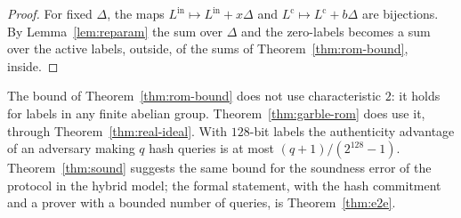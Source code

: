 \begin{proof}
  \leanok
  For fixed $\Delta$, the maps $L^{\mathrm{in}} \mapsto L^{\mathrm{in}} + x\Delta$ and
  $L^{\mathrm{c}} \mapsto L^{\mathrm{c}} + b\Delta$ are bijections. By Lemma~\ref{lem:reparam}
  the sum over $\Delta$ and the zero-labels becomes a sum over the active labels, outside, of the
  sums of Theorem~\ref{thm:rom-bound}, inside.
\end{proof}

\begin{remark}
  The bound of Theorem~\ref{thm:rom-bound} does not use characteristic $2$: it holds for labels in
  any finite abelian group. Theorem~\ref{thm:garble-rom} does use it, through
  Theorem~\ref{thm:real-ideal}. With $128$-bit labels the authenticity advantage of an adversary
  making $q$ hash queries is at most $(q + 1)/(2^{128} - 1)$. Theorem~\ref{thm:sound} suggests the
  same bound for the soundness error of the protocol in the hybrid model; the formal statement,
  with the hash commitment and a prover with a bounded number of queries, is
  Theorem~\ref{thm:e2e}.
\end{remark}
